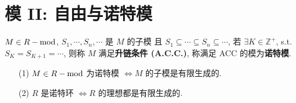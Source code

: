 \documentclass{note}
\begin{document}
\fi
\chapter{模 II: 自由与诺特模}
\begin{df}[诺特 (Notherian) 模]
    $M\in R-\operatorname{mod}$, $S_1,\cdots,S_n,\cdots$ 是 $M$ 的子模 且 $S_1\subseteq\cdots\subseteq S_n\subseteq\cdots$, 若 $\exists K\in\mathbb{Z}^+$, s.t. $S_K=S_{K+1}=\cdots$, 则称 $M$ 满足\textbf{升链条件 (A.C.C.)}, 称满足 ACC 的模为\textbf{诺特模}.
\end{df}

\begin{thm}[(课本定理 5.7)]\label{thm-5.7}
    \begin{itemize}
        \item[(1)] $M\in R-\operatorname{mod}$ 为诺特模 $\Longleftrightarrow M$ 的子模是有限生成的.
        \item[(2)] $R$ 是诺特环 $\Longleftrightarrow R$ 的理想都是有限生成的.
    \end{itemize}
\end{thm}
\end{document}
